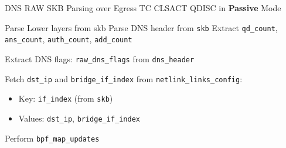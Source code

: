 \documentclass [11pt, proquest] {uwthesis}[2020/02/24]
\begin{document}
\vspace{-10pt}
\begin{algorithm}[H]
\caption{DNS RAW SKB Parsing over Egress TC CLSACT QDISC in \textbf{Passive} Mode }
\label{sec:alg4}

\small %


Parse Lower layers from skb
% 
Parse DNS header from \texttt{skb}\;
Extract \texttt{qd\_count}, \texttt{ans\_count}, \texttt{auth\_count}, \texttt{add\_count}\;


Extract DNS flags: \texttt{raw\_dns\_flags} from \texttt{dns\_header}\;



Fetch \texttt{dst\_ip} and \texttt{bridge\_if\_index} from \texttt{netlink\_links\_config}:
\begin{itemize}[nosep]
    \item Key: \texttt{if\_index} (from \texttt{skb})
    \item Values: \texttt{dst\_ip}, \texttt{bridge\_if\_index}
\end{itemize}

Perform \texttt{bpf\_map\_updates}

\end{algorithm}
\end{document}
